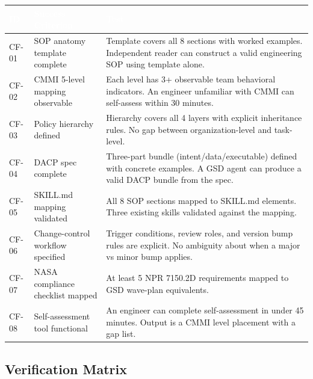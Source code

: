 \documentclass[11pt,letterpaper]{article}
\newcommand{\tableheader}[1]{\textbf{\sffamily\textcolor{white}{#1}}}
\begin{document}
\begin{center}
\begin{tabularx}{\textwidth}{L{1.5cm}L{3.5cm}X}
\toprule
{}
\tableheader{ID} & \tableheader{Success Criterion} & \tableheader{Test} \\
\midrule
CF-01 & SOP anatomy template complete & Template covers all 8 sections with worked examples. Independent reader can construct a valid engineering SOP using template alone. \\
CF-02 & CMMI 5-level mapping observable & Each level has 3+ observable team behavioral indicators. An engineer unfamiliar with CMMI can self-assess within 30 minutes. \\
CF-03 & Policy hierarchy defined & Hierarchy covers all 4 layers with explicit inheritance rules. No gap between organization-level and task-level. \\
CF-04 & DACP spec complete & Three-part bundle (intent/data/executable) defined with concrete examples. A GSD agent can produce a valid DACP bundle from the spec. \\
CF-05 & SKILL.md mapping validated & All 8 SOP sections mapped to SKILL.md elements. Three existing skills validated against the mapping. \\
CF-06 & Change-control workflow specified & Trigger conditions, review roles, and version bump rules are explicit. No ambiguity about when a major vs minor bump applies. \\
CF-07 & NASA compliance checklist mapped & At least 5 NPR 7150.2D requirements mapped to GSD wave-plan equivalents. \\
CF-08 & Self-assessment tool functional & An engineer can complete self-assessment in under 45 minutes. Output is a CMMI level placement with a gap list. \\
\bottomrule
\end{tabularx}
\end{center}

\subsection{Verification Matrix}
\end{document}

